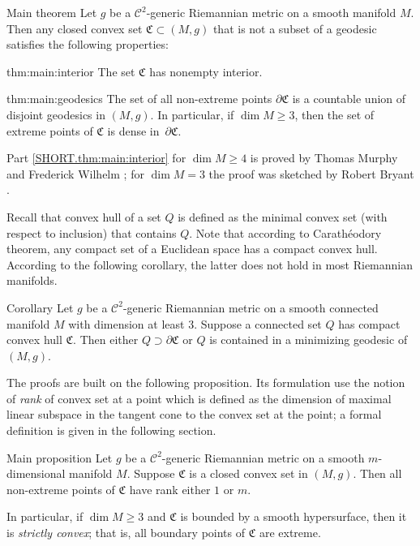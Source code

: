 \documentclass[a4paper,10pt]{article}
\begin{document}
\begin{thm}{Main theorem}\label{thm:main}
Let $g$ be a $\mathcal C^2$-generic Riemannian metric on a smooth manifold $M$.
Then any closed convex set $\mathfrak{C}\subset (M,g)$ that is not a subset of a geodesic
satisfies the following properties:

\begin{subthm}{thm:main:interior}
The set $\mathfrak{C}$ has nonempty interior.
\end{subthm}

\begin{subthm}{thm:main:geodesics}
The set of all non-extreme points $\partial\mathfrak{C}$ is a countable union of disjoint geodesics in $(M,g)$.
In particular, if $\dim M\ge 3$, then the set of
extreme points of $\mathfrak{C}$ is dense in~$\partial\mathfrak{C}$.
\end{subthm}

\end{thm}

Part \ref{SHORT.thm:main:interior} for $\dim M\ge 4$ is proved by Thomas Murphy and Frederick Wilhelm \cite{Wilhelm};
for $\dim M=3$ the proof was sketched by Robert Bryant \cite{Bryant}.

Recall that convex hull of a set $Q$ is defined as the minimal convex set (with respect to inclusion) that contains $Q$.
Note that according to Carathéodory theorem, any compact set of a Euclidean space has a compact convex hull.
According to the following corollary, the latter does not hold in most Riemannian manifolds.

\begin{thm}{Corollary}\label{cor:caratheodory}
Let $g$ be a $\mathcal C^2$-generic Riemannian metric on a smooth connected manifold $M$ with dimension at least 3.
Suppose a connected set $Q$ has compact convex hull $\mathfrak{C}$.
Then either $Q\supset \partial \mathfrak{C}$ or $Q$ is contained in a minimizing geodesic of $(M,g)$.
\end{thm}

The proofs are built on the following proposition.
Its formulation use the notion of \emph{rank} of convex set at a point which is defined as the dimension of maximal linear subspace in the tangent cone to the convex set at the point;
a formal definition is given in the following section.

\begin{thm}{Main proposition}\label{prom:rank}
Let $g$ be a $\mathcal C^2$-generic Riemannian metric on a smooth $m$-dimensional manifold $M$.
Suppose $\mathfrak{C}$ is a closed convex set in $(M,g)$.
Then all non-extreme points of $\mathfrak{C}$ have rank either $1$ or $m$.

In particular, if $\dim M\ge 3$ and $\mathfrak{C}$ is bounded by a smooth hypersurface, then it is \emph{strictly convex}; that is, all boundary points of $\mathfrak{C}$ are extreme.
\end{thm}
\end{document}
